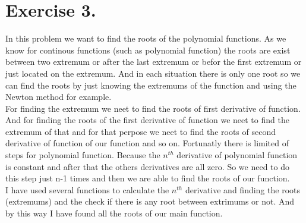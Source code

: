 \documentclass[10pt]{article}
\begin{document}
\section{Exercise 3. }

In this problem we want to find the roots of the polynomial functions. As we know for continous functions (such as polynomial function) the roots are exist between two extremum or after the last extremum or befor the first extremum or just located on the extremum. And in each situation there is only one root so we can find the roots by just knowing the extremums of the function and using the Newton method for example.\\

For finding the extremum we neet to find the roots of first derivative of function. And for finding the roots of the first derivative of function we neet to find the extremum of that and for that perpose we neet to find the roots of second derivative of function of our function and so on. Fortunatly there is limited of steps for polynomial function. Because the $n^{th}$ derivative of polynomial function is constant and after that the others derivatives are all zero. So we need to do this step just n-1 times and then we are able to find the roots of our function.\\

I have used several functions to calculate the $n^{th}$ derivative and finding the roots (extremums) and the check if there is any root between extrimums or not. And by this way I have found all the roots of our main function.\\ 
\end{document}
